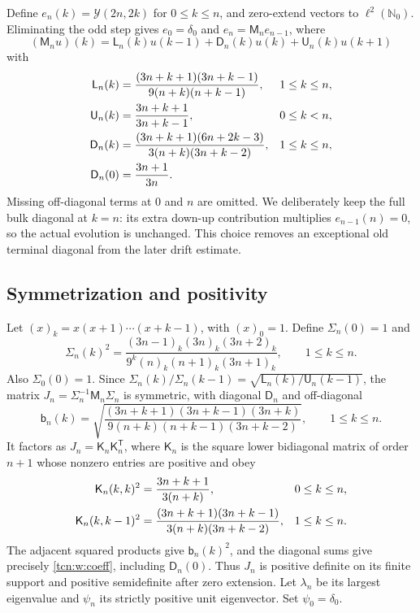 \documentclass[11pt,letterpaper]{article}
\newcommand{\N}{\mathbb N}
\theoremstyle{remark}
\begin{document}
Define $e_n(k)=\mathcal Y(2n,2k)$ for $0\le k\le n$, and zero-extend vectors to $\ell^2(\N_0)$. Eliminating the odd step gives $e_0=\delta_0$ and $e_n=\mathsf M_ne_{n-1}$, where
\begin{equation}\label{tcn:w:A}
 (\mathsf M_nu)(k)=\mathsf L_n(k)u(k-1)+\mathsf D_n(k)u(k)+\mathsf U_n(k)u(k+1)
\end{equation}
with
\begin{align}
 \mathsf L_n(k)&=\frac{(3n+k+1)(3n+k-1)}{9(n+k)(n+k-1)},&&1\le k\le n,\notag\\
 \mathsf U_n(k)&=\frac{3n+k+1}{3n+k-1},&&0\le k<n,\label{tcn:w:coeff}\\
 \mathsf D_n(k)&=\frac{(3n+k+1)(6n+2k-3)}{3(n+k)(3n+k-2)},&&1\le k\le n,\notag\\
 \mathsf D_n(0)&=\frac{3n+1}{3n}.&&\notag
\end{align}
Missing off-diagonal terms at $0$ and $n$ are omitted. We deliberately keep the full bulk diagonal at $k=n$: its extra down-up contribution multiplies $e_{n-1}(n)=0$, so the actual evolution is unchanged. This choice removes an exceptional old terminal diagonal from the later drift estimate.

\subsection{Symmetrization and positivity}
Let $(x)_k=x(x+1)\cdots(x+k-1)$, with $(x)_0=1$. Define $\Sigma_n(0)=1$ and
\begin{equation}\label{tcn:w:S}
 \Sigma_n(k)^2=\frac{(3n-1)_k(3n)_k(3n+2)_k}
 {9^k(n)_k(n+1)_k(3n+1)_k},\qquad 1\le k\le n.
\end{equation}
Also $\Sigma_0(0)=1$. Since $\Sigma_n(k)/\Sigma_n(k-1)=\sqrt{\mathsf L_n(k)/\mathsf U_n(k-1)}$, the matrix $J_n=\Sigma_n^{-1}\mathsf M_n\Sigma_n$ is symmetric, with diagonal $\mathsf D_n$ and off-diagonal
\begin{equation}\label{tcn:w:beta}
 \mathsf b_n(k)=\sqrt{\frac{(3n+k+1)(3n+k-1)(3n+k)}
 {9(n+k)(n+k-1)(3n+k-2)}},\qquad1\le k\le n.
\end{equation}
It factors as $J_n=\mathsf K_n\mathsf K_n^{\mathsf T}$, where $\mathsf K_n$ is the square lower bidiagonal matrix of order $n+1$ whose nonzero entries are positive and obey
\begin{align}
 \mathsf K_n(k,k)^2&=\frac{3n+k+1}{3(n+k)},&&0\le k\le n,\label{tcn:w:factor}\\
 \mathsf K_n(k,k-1)^2&=\frac{(3n+k+1)(3n+k-1)}{3(n+k)(3n+k-2)},&&1\le k\le n.\notag
\end{align}
The adjacent squared products give $\mathsf b_n(k)^2$, and the diagonal sums give precisely \eqref{tcn:w:coeff}, including $\mathsf D_n(0)$. Thus $J_n$ is positive definite on its finite support and positive semidefinite after zero extension. Let $\lambda_n$ be its largest eigenvalue and $\psi_n$ its strictly positive unit eigenvector. Set $\psi_0=\delta_0$.
\end{document}
